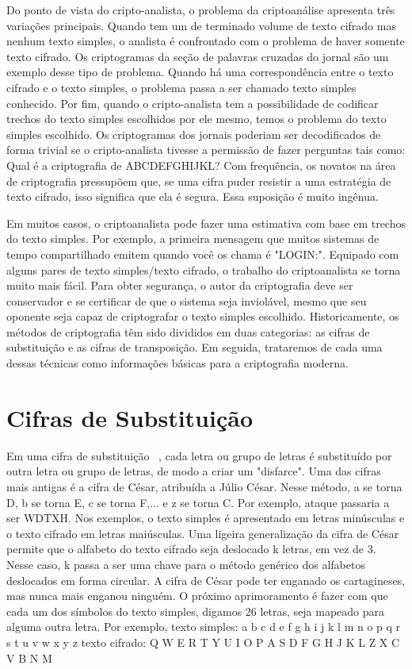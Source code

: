 Do ponto de vista do cripto-analista, o problema da criptoanálise apresenta três variações 
principais. Quando tem um de terminado volume de texto cifrado mas nenhum texto simples, o 
analista é confrontado com o problema de haver somente texto cifrado. Os criptogramas da seção 
de palavras cruzadas do jornal são um exemplo desse tipo de problema. Quando há uma 
correspondência entre o texto cifrado e o texto simples, o problema passa a ser chamado texto 
simples conhecido. Por fim, quando o cripto-analista tem a possibilidade de codificar trechos do texto simples escolhidos por ele mesmo, temos o problema do texto simples escolhido. Os 
criptogramas dos jornais poderiam ser decodificados de forma trivial se o cripto-analista tivesse a permissão de fazer perguntas tais como: Qual é a criptografia de ABCDEFGHIJKL? 
Com frequência, os novatos na área de criptografia pressupõem que, se uma cifra puder resistir a uma estratégia de texto cifrado, isso significa que ela é segura. Essa suposição é muito ingênua. 

Em muitos casos, o criptoanalista pode fazer uma estimativa com base em trechos do texto 
simples. Por exemplo, a primeira mensagem que muitos sistemas de tempo compartilhado emitem 
quando você os chama é "LOGIN:". Equipado com alguns pares de texto simples/texto cifrado, o 
trabalho do criptoanalista se torna muito mais fácil. Para obter segurança, o autor da criptografia deve ser conservador e se certificar de que o sistema seja inviolável, mesmo que seu oponente seja capaz de criptografar o texto simples escolhido. 
Historicamente, os métodos de criptografia têm sido divididos em duas categorias: as cifras de 
substituição e as cifras de transposição. Em seguida, trataremos de cada uma dessas técnicas 
como informações básicas para a criptografia moderna.



\section{Cifras de Substituição}

Em uma cifra de substituição ~\cite{tanenbaum}, cada letra ou grupo de letras é substituído por outra letra ou grupo de letras, de modo a criar um "disfarce". Uma das cifras mais antigas é a cifra de César, atribuída a Júlio César. Nesse método, a se torna D, b se torna E, c se torna F,... e z se torna C. Por exemplo, ataque passaria a ser WDTXH. Nos exemplos, o texto simples é apresentado em letras minúsculas e o texto cifrado em letras maiúsculas. 
Uma ligeira generalização da cifra de César permite que o alfabeto do texto cifrado seja deslocado k letras, em vez de 3. Nesse caso, k passa a ser uma chave para o método genérico dos alfabetos deslocados em forma circular. A cifra de César pode ter enganado os cartagineses, mas nunca mais enganou ninguém. 
O próximo aprimoramento é fazer com que cada um dos símbolos do texto simples, digamos 26 
letras, seja mapeado para alguma outra letra. Por exemplo, 
texto simples: a b c d e f g h i j k l m n o p q r s t u v w x y z 
texto cifrado: Q W E R T Y U I O P A S D F G H J K L Z X C V B N M

